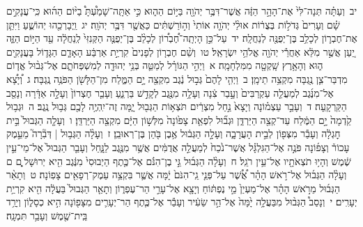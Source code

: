\documentclass[18pt]{article}
\newcommand{\kri}[1]{\Afootnote{#1}}	%
\begin{document}
 {\loc יב~}וְעַתָּ֗ה תְּנָה־לִּי֙ אֶת־הָהָ֣ר הַזֶּ֔ה אֲשֶׁר־דִּבֶּ֥ר יְהֹוָ֖ה בַּיּ֣וֹם הַה֑וּא כִּ֣י אַתָּֽה־שָׁמַ֩עְתָּ֩ בַיּ֨וֹם הַה֜וּא כִּֽי־עֲנָקִ֣ים שָׁ֗ם וְעָרִים֙ גְּדֹל֣וֹת בְּצֻר֔וֹת אוּלַ֨י יְהֹוָ֤ה אוֹתִי֙ וְה֣וֹרַשְׁתִּ֔ים כַּאֲשֶׁ֖ר דִּבֶּ֥ר יְהֹוָֽה׃ \startlock
 {\loc יג~}וַֽיְבָרְכֵ֖הוּ יְהוֹשֻׁ֑עַ וַיִּתֵּ֧ן אֶת־חֶבְר֛וֹן לְכָלֵ֥ב בֶּן־יְפֻנֶּ֖ה לְנַחֲלָֽה׃ \startlock
 {\loc יד~}עַל־כֵּ֣ן הָיְתָֽה־חֶ֠בְר֠וֹן לְכָלֵ֨ב בֶּן־יְפֻנֶּ֤ה הַקְּנִזִּי֙ לְֽנַחֲלָ֔ה עַ֖ד הַיּ֣וֹם הַזֶּ֑ה יַ֚עַן אֲשֶׁ֣ר מִלֵּ֔א אַחֲרֵ֕י יְהֹוָ֖ה אֱלֹהֵ֥י יִשְׂרָאֵֽל׃ \startlock
 {\loc טו~}וְשֵׁ֨ם חֶבְר֤וֹן לְפָנִים֙ קִרְיַ֣ת אַרְבַּ֔ע הָאָדָ֧ם הַגָּד֛וֹל בָּעֲנָקִ֖ים ה֑וּא וְהָאָ֥רֶץ שָֽׁקְטָ֖ה מִמִּלְחָמָֽה׃ 
\startlock
 {\loc א~}וַיְהִ֣י הַגּוֹרָ֗ל לְמַטֵּ֛ה בְּנֵ֥י יְהוּדָ֖ה לְמִשְׁפְּחֹתָ֑ם אֶל־גְּב֨וּל אֱד֧וֹם מִדְבַּר־צִ֛ן נֶ֖גְבָּה מִקְצֵ֥ה תֵימָֽן׃ \startlock
 {\loc ב~}וַיְהִ֤י לָהֶם֙ גְּב֣וּל נֶ֔גֶב מִקְצֵ֖ה יָ֣ם הַמֶּ֑לַח מִן־הַלָּשֹׁ֖ן הַפֹּנֶ֥ה נֶֽגְבָּה׃ \startlock
 {\loc ג~}וְ֠יָצָ֠א אֶל־מִנֶּ֜גֶב לְמַעֲלֵ֤ה עַקְרַבִּים֙ וְעָ֣בַר צִ֔נָה וְעָלָ֥ה מִנֶּ֖גֶב לְקָדֵ֣שׁ בַּרְנֵ֑עַ וְעָבַ֤ר חֶצְרוֹן֙ וְעָלָ֣ה אַדָּ֔רָה וְנָסַ֖ב הַקַּרְקָֽעָה׃ \startlock
 {\loc ד~}וְעָבַ֣ר עַצְמ֗וֹנָה וְיָצָא֙ נַ֣חַל מִצְרַ֔יִם  \edtext{(והיה)}{\kri{קרי: וְהָי֛וּ}}  תֹּצְא֥וֹת הַגְּב֖וּל יָ֑מָּה זֶה־יִֽהְיֶ֥ה לָכֶ֖ם גְּב֥וּל נֶֽגֶב׃ \startlock
 {\loc ה~}וּגְב֥וּל קֵ֙דְמָה֙ יָ֣ם הַמֶּ֔לַח עַד־קְצֵ֖ה הַיַּרְדֵּ֑ן וּגְב֞וּל לִפְאַ֤ת צָפ֙וֹנָה֙ מִלְּשׁ֣וֹן הַיָּ֔ם מִקְצֵ֖ה הַיַּרְדֵּֽן׃ \startlock
 {\loc ו~}וְעָלָ֤ה הַגְּבוּל֙ בֵּ֣ית חׇגְלָ֔ה וְעָבַ֕ר מִצְּפ֖וֹן לְבֵ֣ית הָעֲרָבָ֑ה וְעָלָ֣ה הַגְּב֔וּל אֶ֥בֶן בֹּ֖הַן בֶּן־רְאוּבֵֽן׃ \startlock
 {\loc ז~}וְעָלָ֨ה הַגְּב֥וּל  |  דְּבִ֘רָה֮ מֵעֵ֣מֶק עָכוֹר֒ וְצָפ֜וֹנָה פֹּנֶ֣ה אֶל־הַגִּלְגָּ֗ל אֲשֶׁר־נֹ֙כַח֙ לְמַעֲלֵ֣ה אֲדֻמִּ֔ים אֲשֶׁ֥ר מִנֶּ֖גֶב לַנָּ֑חַל וְעָבַ֤ר הַגְּבוּל֙ אֶל־מֵי־עֵ֣ין שֶׁ֔מֶשׁ וְהָי֥וּ תֹצְאֹתָ֖יו אֶל־עֵ֥ין רֹגֵֽל׃ \startlock
 {\loc ח~}וְעָלָ֨ה הַגְּב֜וּל גֵּ֣י בֶן־הִנֹּ֗ם אֶל־כֶּ֤תֶף הַיְבוּסִי֙ מִנֶּ֔גֶב הִ֖יא יְרוּשָׁל ָ֑͏ְם ם וְעָלָ֨ה הַגְּב֜וּל אֶל־רֹ֣אשׁ הָהָ֗ר אֲ֠שֶׁ֠ר עַל־פְּנֵ֤י גֵֽי־הִנֹּם֙ יָ֔מָּה אֲשֶׁ֛ר בִּקְצֵ֥ה עֵמֶק־רְפָאִ֖ים צָפֽוֹנָה׃ \startlock
 {\loc ט~}וְתָאַ֨ר הַגְּב֜וּל מֵרֹ֣אשׁ הָהָ֗ר אֶל־מַעְיַן֙ מֵ֣י נֶפְתּ֔וֹחַ וְיָצָ֖א אֶל־עָרֵ֣י הַר־עֶפְר֑וֹן וְתָאַ֤ר הַגְּבוּל֙ בַּעֲלָ֔ה הִ֖יא קִרְיַ֥ת יְעָרִֽים׃ \startlock
 {\loc י~}וְנָסַב֩ הַגְּב֨וּל מִבַּעֲלָ֥ה יָ֙מָּה֙ אֶל־הַ֣ר שֵׂעִ֔יר וְעָבַ֕ר אֶל־כֶּ֧תֶף הַר־יְעָרִ֛ים מִצָּפ֖וֹנָה הִ֣יא כְסָל֑וֹן וְיָרַ֥ד בֵּֽית־שֶׁ֖מֶשׁ וְעָבַ֥ר תִּמְנָֽה׃ \startlock
\end{document}
